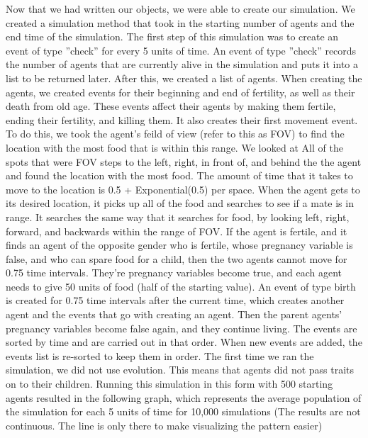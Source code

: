 \documentclass[11pt]{article}
\begin{document}
\begin{multicols}{2}
Now that we had written our objects, we were able to create our simulation. We created a simulation method that took in the starting number of agents and the end time of the simulation. The first step of this simulation was to create an event of type ''check'' for every 5 units of time. An event of type ''check'' records the number of agents that are currently alive in the simulation and puts it into a list to be returned later. \newline
After this, we created a list of agents. When creating the agents, we created events for their beginning and end of fertility, as well as their death from old age. These events affect their agents by making them fertile, ending their fertility, and killing them.
\newline
It also creates their first movement event. To do this, we took the agent's feild of view (refer to this as FOV) to find the location with the most food that is within this range. We looked at All of the spots that were FOV steps to the left, right, in front of, and behind the the agent and found the location with the most food. The amount of time that it takes to move to the location is 0.5 + Exponential(0.5) per space. When the agent gets to its desired location, it picks up all of the food and searches to see if a mate is in range. It searches the same way that it searches for food, by looking left, right, forward, and backwards within the range of FOV. If the agent is fertile, and it finds an agent of the opposite gender who is fertile, whose pregnancy variable is false, and who can spare food for a child, then the two agents cannot move for 0.75 time intervals. They're pregnancy variables become true, and each agent needs to give 50 units of food (half of the starting value). An event of type birth is created for 0.75 time intervals after the current time, which creates another agent and the events that go with creating an agent. Then the parent agents' pregnancy variables become false again, and they continue living. \newline
The events are sorted by time and are carried out in that order. When new events are added, the events list is re-sorted to keep them in order.
\newline
The first time we ran the simulation, we did not use evolution. This means that agents did not pass traits on to their children. Running this simulation in this form with 500 starting agents resulted in the following graph, which represents the average population of the simulation for each 5 units of time for 10,000 simulations (The results are not continuous. The line is only there to make visualizing the pattern easier)\newline

\end{multicols}
\end{document}
